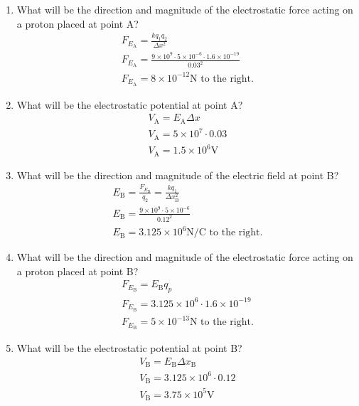 \documentclass[12pt]{article}
\begin{document}
\begin{enumerate}
\begin{enumerate}
  \item What will be the direction and magnitude of the electrostatic force acting on a proton placed at point A?
    \begin{align}
      F_{E_{\mathrm{A}}} = \frac{kq_{1}q_{2}}{\Delta x^{2}} \\
      F_{E_{\mathrm{A}}} = \frac{9\times 10^{9} \cdot 5 \times 10^{-6} \cdot 1.6 \times 10^{-19}}{0.03^{2}} \\
      F_{E_{\mathrm{A}}} = 8 \times 10^{-12} \mathrm{N} \text{ to the right.}
    \end{align}

  \item What will be the electrostatic potential at point A?
    \begin{align}
      V_{\mathrm{A}} = E_{\mathrm{A}} \Delta x \\
      V_{\mathrm{A}} = 5 \times 10^{7} \cdot 0.03 \\
      V_{\mathrm{A}} = 1.5 \times 10^{6} \mathrm{V}
    \end{align}

  \item What will be the direction and magnitude of the electric field at point B?
    \begin{align}
      E_{\mathrm{B}} = \frac{F_{E_{\mathrm{B}}}}{q_{2}} = \frac{kq_{1}}{\Delta x_{\mathrm{B}}^2} \\
      E_{\mathrm{B}} = \frac{9 \times 10^{9} \cdot 5 \times 10^{-6}}{0.12^2} \\
      E_{\mathrm{B}} = 3.125 \times 10^{6} \mathrm{N/C} \text{ to the right.}
    \end{align}

  \item What will be the direction and magnitude of the electrostatic force acting on a proton placed at point B?
    \begin{align}
      F_{E_{\mathrm{B}}} = E_{\mathrm{B}} q_{p} \\
      F_{E_{\mathrm{B}}} = 3.125 \times 10^{6} \cdot 1.6 \times 10^{-19} \\
      F_{E_{\mathrm{B}}} = 5 \times 10^{-13} \mathrm{N} \text{ to the right.}
    \end{align}

  \item What will be the electrostatic potential at point B?
    \begin{align}
      V_{\mathrm{B}} = E_{\mathrm{B}} \Delta x_{\mathrm{B}} \\
      V_{\mathrm{B}} = 3.125 \times 10^{6} \cdot 0.12 \\
      V_{\mathrm{B}} = 3.75 \times 10^{5} \mathrm{V}
    \end{align}


\end{enumerate}
\end{enumerate}
\end{document}
